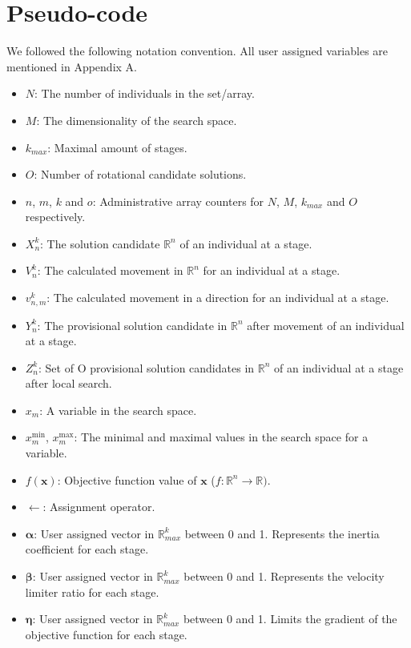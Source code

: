 \documentclass[runningheads]{llncs}
\begin{document}
\section{Pseudo-code}
\label{secPseu}
We followed the following notation convention. All user assigned variables are mentioned in Appendix A.
\begin{itemize}
    \item $N$: The number of individuals in the set/array.
    \item $M$: The dimensionality of the search space.
    \item $k_{max}$: Maximal amount of stages.
    \item $O$: Number of rotational candidate solutions.
    \item $n$, $m$, $k$ and $o$: Administrative array counters for $N$, $M$, $k_{max}$ and $O$ respectively.
    \item $X_n^k$: The solution candidate $\mathds{R}^n$ of an individual at a stage.
    \item $V_n^k$: The calculated movement in $\mathds{R}^n$ for an individual at a stage.
    \item $v_{n,m}^k$: The calculated movement in a direction for an individual at a stage.
    \item $Y_n^k$: The provisional solution candidate in $\mathds{R}^n$ after movement of an individual at a stage.
    \item $Z_n^{k}$: Set of O provisional solution candidates in $\mathds{R}^n$ of an individual at a stage after local search.
    \item $x_m$: A variable in the search space.
    \item $x_m^{\text{min}}$, $x_m^{\text{max}}$: The minimal and maximal values in the search space for a variable.
    \item $f(\mathbf{x})$: Objective function value of $\mathbf{x}$ ($f: \mathds{R}^n \rightarrow \mathds{R})$.
    \item $\leftarrow$: Assignment operator.
    \item $\boldsymbol{\alpha}$: User assigned vector in $\mathds{R}^k_{max}$ between 0 and 1. Represents the inertia coefficient for each stage.
    \item $\boldsymbol{\beta}$: User assigned vector in $\mathds{R}^k_{max}$ between 0 and 1. Represents the velocity limiter ratio for each stage.
    \item $\boldsymbol{\eta}$: User assigned vector in $\mathds{R}^k_{max}$ between 0 and 1. Limits the gradient of the objective function for each stage.

\end{itemize}
\end{document}
